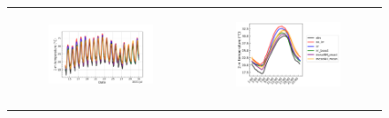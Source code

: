 \begin{figure}[hbtp]
    \centering
    \begin{tabular}{cc}
        \begin{subfigure}[t]{0.5\textwidth}
            \caption{}
            \includegraphics[width=\textwidth]{images/chap5/time_series_cendrosa_t2m.png}
        \end{subfigure} &
        \begin{subfigure}[t]{0.5\textwidth}
            \caption{}
            \includegraphics[width=\textwidth]{images/chap5/diurnal_cycle_cendrosa_t2m.png}
        \end{subfigure} \\
        
        \vspace{1em} %


\end{tabular}
\end{figure}
